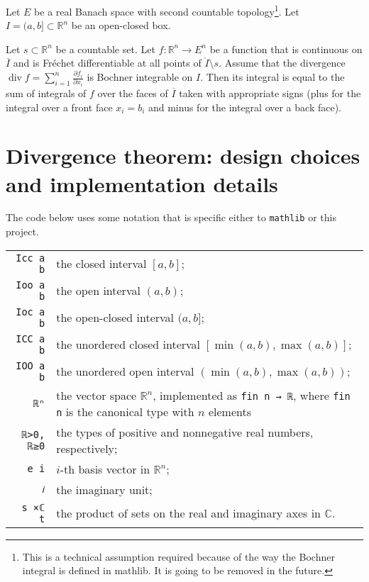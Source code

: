 \documentclass[a4paper,UKenglish,cleveref, autoref, thm-restate]{lipics-v2021}
\newcommand{\bbR}{\mathbb{R}}
\newcommand{\bbC}{\mathbb{C}}
\DeclareMathOperator{\divg}{div}
\begin{document}
\begin{theorem}%
  \label{thm:divergence-Bochner}
  Let \(E\) be a real Banach space with second countable
  topology\footnote{This is a technical assumption required because of
    the way the Bochner integral is defined in mathlib. It is going to
    be removed in the future.}. Let \(I=(a,b]\subset\bbR^{n}\) be an
  open-closed box.

  Let \(s \subset\bbR^{n}\) be a countable set. Let
  \(f\colon \bbR^{n}\to E^{n}\) be a function that is continuous on
  \(\overline I\) and is Fréchet differentiable at all points of
  \(\mathring I \setminus s\). Assume that the divergence
  \(\divg f=\sum_{i=1}^{n}\frac{\partial f_{i}}{\partial x_{i}}\) is
  Bochner integrable on \(I\). Then its integral is equal to the sum
  of integrals of \(f\) over the faces of \(\overline I\) taken with
  appropriate signs (plus for the integral over a front face
  \(x_{i}=b_{i}\) and minus for the integral over a back face).
\end{theorem}

\section{Divergence theorem: design choices and implementation details}%
\label{sec:GP-impl}
The code below uses some notation that is specific either to
\texttt{mathlib} or this project.

\noindent
\begin{tabular}{rp{12cm}}
  \lstinline=Icc a b=& the closed interval \([a, b]\);\\
  \lstinline=Ioo a b= & the open interval \((a, b)\);\\
  \lstinline=Ioc a b= & the open-closed interval \((a, b]\);\\
  \lstinline=ICC a b=& the unordered closed interval \([\min(a, b), \max(a, b)]\);\\
  \lstinline=IOO a b=& the unordered open interval \((\min(a, b), \max(a, b))\);\\
  \lstinline=ℝⁿ=& the vector space \(\bbR^{n}\), implemented as \lstinline=fin n → ℝ=,
                  where \lstinline+fin n+ is the canonical type with \(n\) elements\\
  \lstinline=ℝ>0, ℝ≥0= & the types of positive and nonnegative real numbers, respectively;\\
  \lstinline=e i= & \(i\)-th basis vector in \(\bbR^{n}\);\\
  \lstinline=𝑖= & the imaginary unit;\\
  \lstinline=s ×ℂ t= & the product of sets on the real and imaginary axes in \(\bbC\).
\end{tabular}
\end{document}
